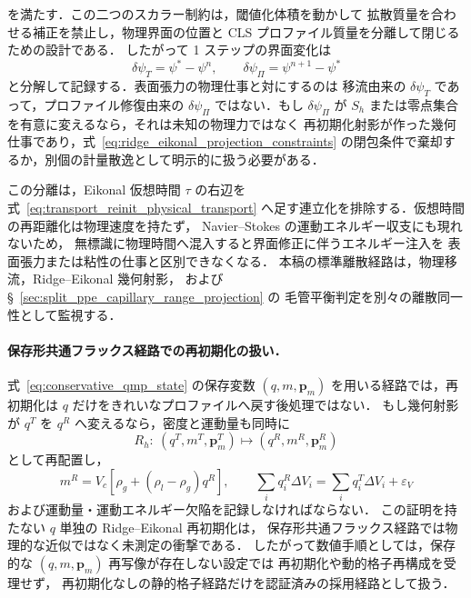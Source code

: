 を満たす．この二つのスカラー制約は，閾値化体積を動かして
拡散質量を合わせる補正を禁止し，物理界面の位置と
CLS プロファイル質量を分離して閉じるための設計である．
したがって 1 ステップの界面変化は
\begin{equation}
  \delta\psi_T=\psi^\ast-\psi^n,\qquad
  \delta\psi_\Pi=\psi^{n+1}-\psi^\ast
  \label{eq:transport_projection_variation_split}
\end{equation}
と分解して記録する．表面張力の物理仕事と対にするのは
移流由来の $\delta\psi_T$ であって，プロファイル修復由来の
$\delta\psi_\Pi$ ではない．もし $\delta\psi_\Pi$ が
$S_h$ または零点集合を有意に変えるなら，それは未知の物理力ではなく
再初期化射影が作った幾何仕事であり，式~\eqref{eq:ridge_eikonal_projection_constraints}
の閉包条件で棄却するか，別個の計量散逸として明示的に扱う必要がある．

この分離は，Eikonal 仮想時間 $\tau$ の右辺を式~\eqref{eq:transport_reinit_physical_transport}
へ足す連立化を排除する．仮想時間の再距離化は物理速度を持たず，
Navier--Stokes の運動エネルギー収支にも現れないため，
無標識に物理時間へ混入すると界面修正に伴うエネルギー注入を
表面張力または粘性の仕事と区別できなくなる．
本稿の標準離散経路は，物理移流，Ridge--Eikonal 幾何射影，
および §~\ref{sec:split_ppe_capillary_range_projection} の
毛管平衡判定を別々の離散同一性として監視する．

\paragraph{保存形共通フラックス経路での再初期化の扱い．}
式~\eqref{eq:conservative_qmp_state} の保存変数
$(q,m,\bm{p}_m)$ を用いる経路では，再初期化は
$q$ だけをきれいなプロファイルへ戻す後処理ではない．
もし幾何射影が $q^T$ を $q^R$ へ変えるなら，密度と運動量も同時に
\[
  R_h:\ (q^T,m^T,\bm{p}_m^T)\longmapsto(q^R,m^R,\bm{p}_m^R)
\]
として再配置し，
\[
  m^R=V_c[\rho_g+(\rho_l-\rho_g)q^R],\qquad
  \sum_i q_i^R\Delta V_i=\sum_i q_i^T\Delta V_i+\varepsilon_V
\]
および運動量・運動エネルギー欠陥を記録しなければならない．
この証明を持たない $q$ 単独の Ridge--Eikonal 再初期化は，
保存形共通フラックス経路では物理的な近似ではなく未測定の衝撃である．
したがって数値手順としては，保存的な $(q,m,\bm{p}_m)$ 再写像が存在しない設定では
再初期化や動的格子再構成を受理せず，
再初期化なしの静的格子経路だけを認証済みの採用経路として扱う．


